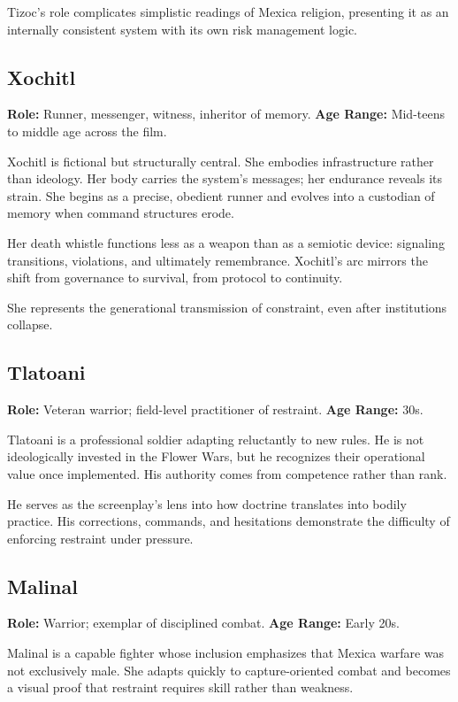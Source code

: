 \documentclass[12pt]{article}
\begin{document}
Tizoc's role complicates simplistic readings of Mexica religion, presenting it as an internally consistent system with its own risk management logic.

\subsection*{Xochitl}

\textbf{Role:} Runner, messenger, witness, inheritor of memory.  
\textbf{Age Range:} Mid-teens to middle age across the film.

Xochitl is fictional but structurally central. She embodies infrastructure rather than ideology. Her body carries the system's messages; her endurance reveals its strain. She begins as a precise, obedient runner and evolves into a custodian of memory when command structures erode.

Her death whistle functions less as a weapon than as a semiotic device: signaling transitions, violations, and ultimately remembrance. Xochitl's arc mirrors the shift from governance to survival, from protocol to continuity.

She represents the generational transmission of constraint, even after institutions collapse.

\subsection*{Tlatoani}

\textbf{Role:} Veteran warrior; field-level practitioner of restraint.  
\textbf{Age Range:} 30s.

Tlatoani is a professional soldier adapting reluctantly to new rules. He is not ideologically invested in the Flower Wars, but he recognizes their operational value once implemented. His authority comes from competence rather than rank.

He serves as the screenplay's lens into how doctrine translates into bodily practice. His corrections, commands, and hesitations demonstrate the difficulty of enforcing restraint under pressure.

\subsection*{Malinal}

\textbf{Role:} Warrior; exemplar of disciplined combat.  
\textbf{Age Range:} Early 20s.

Malinal is a capable fighter whose inclusion emphasizes that Mexica warfare was not exclusively male. She adapts quickly to capture-oriented combat and becomes a visual proof that restraint requires skill rather than weakness.
\end{document}
